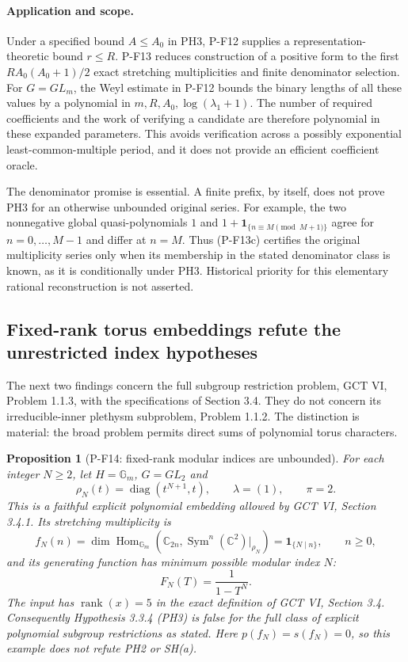 \documentclass[11pt,a4paper]{article}
\newtheorem{proposition}{Proposition}[section]
\begin{document}
\paragraph{Application and scope.}
Under a specified bound $A\le A_0$ in PH3, P-F12 supplies a
representation-theoretic bound $r\le R$. P-F13 reduces construction of
a positive form to the first $RA_0(A_0+1)/2$ exact stretching
multiplicities and finite denominator selection. For $G=GL_m$, the
Weyl estimate in P-F12 bounds the binary lengths of all these values
by a polynomial in $m,R,A_0,\log(\lambda_1+1)$. The number of
required coefficients and the work of verifying a candidate are
therefore polynomial in these expanded parameters. This avoids
verification across a possibly exponential least-common-multiple
period, and it does not provide an efficient coefficient oracle.

The denominator promise is essential. A finite prefix, by itself,
does not prove PH3 for an otherwise unbounded original series.
For example, the two nonnegative global quasi-polynomials
$1$ and $1+\mathbf1_{\{n\equiv M\pmod{M+1}\}}$ agree for
$n=0,\ldots,M-1$ and differ at $n=M$. Thus (P-F13c) certifies the
original multiplicity series only when its membership in the stated
denominator class is known, as it is conditionally under PH3.
Historical priority for this elementary rational reconstruction is
not asserted.


\subsection{Fixed-rank torus embeddings refute the unrestricted index hypotheses}

The next two findings concern the full subgroup restriction problem,
GCT VI, Problem 1.1.3, with the specifications of Section 3.4.
They do not concern its irreducible-inner plethysm subproblem,
Problem 1.1.2. The distinction is material: the broad problem permits
direct sums of polynomial torus characters.

\begin{proposition}[P-F14: fixed-rank modular indices are unbounded]
\label{prop:torusmodular}
For each integer $N\ge2$, let $H=\mathbb G_m$, $G=GL_2$ and
\[
 \rho_N(t)=\operatorname{diag}(t^{N+1},t),\qquad
 \lambda=(1),\qquad \pi=2.
\]
This is a faithful explicit polynomial embedding allowed by
GCT VI, Section 3.4.1. Its stretching multiplicity is
\[
 f_N(n)=\dim\operatorname{Hom}_{\mathbb G_m}
       (\mathbb C_{2n},\operatorname{Sym}^n(\mathbb C^2)|_{\rho_N})
       =\mathbf1_{\{N\mid n\}},\qquad n\ge0,
\]
and its generating function has minimum possible modular index $N$:
\[
 F_N(T)=\frac1{1-T^N}.
 \tag{P-F14}
\]
The input has $\operatorname{rank}(x)=5$ in the exact definition of
GCT VI, Section 3.4. Consequently Hypothesis 3.3.4 (PH3) is false for
the full class of explicit polynomial subgroup restrictions as stated.
Here $p(f_N)=s(f_N)=0$, so this example does not refute PH2 or SH(a).
\end{proposition}
\end{document}
